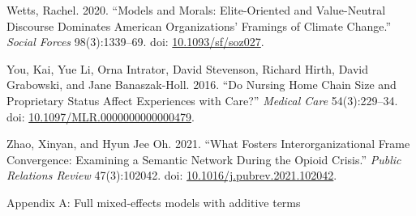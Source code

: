 \documentclass[
  12pt,
]{article}
\begin{document}
\leavevmode\hypertarget{ref-wetts2020}{}%
Wetts, Rachel. 2020. ``Models and Morals: Elite-Oriented and Value-Neutral Discourse Dominates American Organizations' Framings of Climate Change.'' \emph{Social Forces} 98(3):1339--69. doi: \href{https://doi.org/10.1093/sf/soz027}{10.1093/sf/soz027}.

\leavevmode\hypertarget{ref-you2016}{}%
You, Kai, Yue Li, Orna Intrator, David Stevenson, Richard Hirth, David Grabowski, and Jane Banaszak-Holl. 2016. ``Do Nursing Home Chain Size and Proprietary Status Affect Experiences with Care?'' \emph{Medical Care} 54(3):229--34. doi: \href{https://doi.org/10.1097/MLR.0000000000000479}{10.1097/MLR.0000000000000479}.

\leavevmode\hypertarget{ref-zhao2021}{}%
Zhao, Xinyan, and Hyun Jee Oh. 2021. ``What Fosters Interorganizational Frame Convergence: Examining a Semantic Network During the Opioid Crisis.'' \emph{Public Relations Review} 47(3):102042. doi: \href{https://doi.org/10.1016/j.pubrev.2021.102042}{10.1016/j.pubrev.2021.102042}.

\clearpage

\appendix
{}

\renewcommand{\thesection}{A}

\setcounter{page}{1}

\setcounter{table}{0}
\renewcommand{\thetable}{A\arabic{table}}
\renewcommand{\figurename}{Table}

\setcounter{figure}{0}
\renewcommand\thefigure{A\arabic{figure}}
\renewcommand{\figurename}{Figure}

\clearpage
{}

\vspace*{7cm}

\begin{center}
\begin{huge}
Appendix A: Full mixed-effects models with additive terms
\end{huge}
\end{center}
\vspace{3cm}

\clearpage
{}
\end{document}
